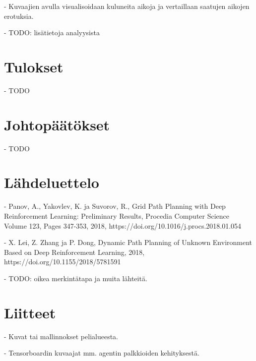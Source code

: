 \documentclass[utf8]{gradu3}
\begin{document}
- Kuvaajien avulla visualisoidaan kuluneita aikoja ja vertaillaan saatujen aikojen erotuksia.

- TODO: lisätietoja analyysista

\chapter{Tulokset}

- TODO

\chapter{Johtopäätökset}

- TODO

\chapter{Lähdeluettelo}

\printbibliography

- Panov, A., Yakovlev, K. ja Suvorov, R., Grid Path Planning with Deep
Reinforcement Learning: Preliminary Results, Procedia Computer Science
Volume 123, Pages 347-353, 2018,
https://doi.org/10.1016/j.procs.2018.01.054

- X. Lei, Z. Zhang ja P. Dong, Dynamic Path Planning of Unknown
Environment Based on Deep Reinforcement Learning, 2018,
https://doi.org/10.1155/2018/5781591

- TODO: oikea merkintätapa ja muita lähteitä.

\chapter{Liitteet}

- Kuvat tai mallinnokset pelialueesta.

- Tensorboardin kuvaajat mm. agentin palkkioiden kehityksestä.
\end{document}

